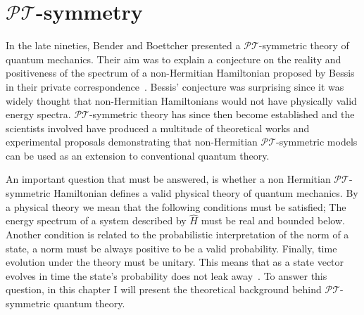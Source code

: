 \documentclass[12pt, a4paper]{report}
\newcommand\PT{\(\mathcal{PT}\)}
\begin{document}
\chapter{\texorpdfstring{$\mathcal{PT}$}\:-symmetry}\label{PT}
In the late nineties, Bender and Boettcher presented a \PT-symmetric theory of quantum mechanics. Their aim was to explain a conjecture on the reality and positiveness of the spectrum of a non-Hermitian Hamiltonian proposed by Bessis in their private correspondence~\cite{RealSpectrainNHH}. Bessis' conjecture was surprising since it was widely thought that non-Hermitian Hamiltonians would not have physically valid energy spectra. 
\PT-symmetric theory has since then become established and the scientists involved have produced a multitude of theoretical works and experimental proposals demonstrating that non-Hermitian \PT-symmetric models can be used as an extension to conventional quantum theory.

An important question that must be answered, is whether a non Hermitian \PT-symmetric Hamiltonian defines a valid physical theory of quantum mechanics. By a physical theory we mean that the following conditions must be satisfied; The energy spectrum of a system described by $\hat{H}$ must be real and bounded below. Another condition is related to the probabilistic interpretation of the norm of a state, a norm must be always positive to be a valid probability. Finally, time evolution under the theory must be unitary. This means that as a state vector evolves in time the state's probability does not leak away~\cite{MustaHbeHermitian,MakingSense}. To answer this question, in this chapter I will present the theoretical background behind \PT-symmetric quantum theory.  

\end{document}
